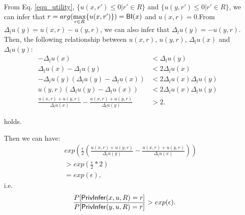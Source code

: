 From Eq. \ref{equ_utility}, $\{u(x,r') \leq 0|r' \in R\}$ and $\{u(y,r') \leq 0|r' \in R\}$, we can infer that $r = arg(\max\limits_{r \in R}\{u(x,r')\}) = \mathsf{BI}(x)$ and $u(x,r) = 0$.From $\Delta_{l}u(y) = u(x,r) - u(y,r)$, we can also infer that $\Delta_{l}u(y) = - u(y,r)$. Then, the following relationship between $u(x,r)$, $u(y,r)$, $\Delta_{l}u(x)$ and $\Delta_{l}u(y)$:
\begin{equation*}
\begin{split}
- \Delta_{l}u(x) & < \Delta_{l}u(y) \\
\Delta_{l}u(x) - \Delta_{l}u(y) & < 2 \Delta_{l}u(x) \\
- \Delta_{l}u(y) (\Delta_{l}u(y) - \Delta_{l}u(x)) 
& < 2 \Delta_{l}u(x) \Delta_{l}u(y) \\
u(y,r) (\Delta_{l}u(y) - \Delta_{l}u(x)) 
& < 2 \Delta_{l}u(x) \Delta_{l}u(y) \\
\frac{u(x,r) + u(y,r)}{\Delta_{l}u(x)} - \frac{u(x,r) + u(y,r)}{\Delta_{l}u(y)} & > 2.
\end{split}
\end{equation*}

holds.
 
Then we can have:
\begin{equation*}
\begin{split}
& exp(\frac{\epsilon}{2} (\frac{u(x,r) + u(y,r)}{\Delta_{l}u(y)} - \frac{u(x,r) + u(y,r)}{\Delta_{l}u(x)}))\\
& > exp(\frac{\epsilon}{2} * 2) \\
& = exp(\epsilon),
\end{split}
\end{equation*}
i.e.
\begin{equation*}
\begin{split}
\frac{P[\mathsf{PrivInfer}(x,u,R) = r]}{P[\mathsf{PrivInfer}(y,u,R) = r]}
& > exp(\epsilon).
\end{split}
\end{equation*}

